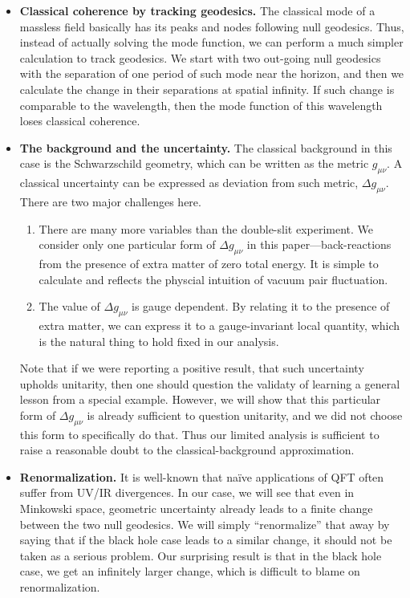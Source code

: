 \documentclass[aps,showpacs,twocolumn,floats,prd,superscriptaddress,nofootinbib]{revtex4-1}
\begin{document}
\begin{itemize}
\item {\bf Classical coherence by tracking geodesics.} The classical mode of a massless field basically has its peaks and nodes following null geodesics.
Thus, instead of actually solving the mode function, we can perform a much simpler calculation to track geodesics.
We start with two out-going null geodesics with the separation of one period of such mode near the horizon, and then we calculate the change in their separations at spatial infinity.
If such change is comparable to the wavelength, then the mode function of this wavelength loses classical coherence.
\item {\bf The background and the uncertainty.} The classical background in this case is the Schwarzschild geometry, which can be written as the metric $g_{\mu\nu}$. 
A classical uncertainty can be expressed as deviation from such metric, $\Delta g_{\mu\nu}$. 
There are two major challenges here.
\begin{enumerate}
\item There are many more variables than the double-slit experiment. 
We consider only one particular form of $\Delta g_{\mu\nu}$ in this paper---back-reactions from the presence of extra matter of zero total energy. 
It is simple to calculate and reflects the physcial intuition of vacuum pair fluctuation.
\item The value of $\Delta g_{\mu\nu}$ is gauge dependent. 
By relating it to the presence of extra matter, we can express it to a gauge-invariant local quantity, which is the natural thing to hold fixed in our analysis.
\end{enumerate}
Note that if we were reporting a positive result, that such uncertainty upholds unitarity, then one should question the validaty of learning a general lesson from a special example. However, we will show that this particular form of $\Delta g_{\mu\nu}$ is already sufficient to question unitarity, and we did not choose this form to specifically do that. Thus our limited analysis is sufficient to raise a reasonable doubt to the classical-background approximation.
\item {\bf Renormalization.} It is well-known that na\"ive applications of QFT often suffer from UV/IR divergences.
In our case, we will see that even in Minkowski space, geometric uncertainty already leads to a finite change between the two null geodesics.
We will simply ``renormalize'' that away by saying that if the black hole case leads to a similar change, it should not be taken as a serious problem.
Our surprising result is that in the black hole case, we get an infinitely larger change, which is difficult to blame on renormalization.
\end{itemize}
\end{document}

